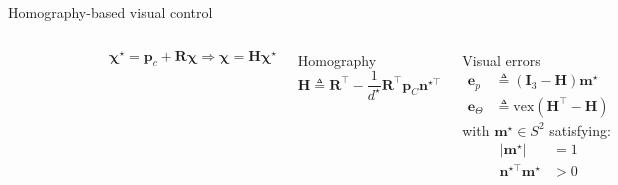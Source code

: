 \documentclass{beamer}
\begin{document}
\begin{frame}{Homography-based visual control}
\begin{columns}
	\begin{figure}
		\includegraphics[width = 50mm]{Images/Notation.png}
	\end{figure}\vspace{-0.5cm}
	$$\mathbf{\chi}^\star = \mathbf{p}_c + \mathbf{R}\mathbf{\chi} \Rightarrow \mathbf{\chi} = \mathbf{H}\mathbf{\chi}^\star$$ \vspace{-0.8cm}	
	\begin{block}{Homography}
		\vspace{-0.3cm}
		\begin{equation*}
		\mathbf{H} \triangleq \mathbf{R}^{\!\top} - \frac{1}{d^\star} \mathbf{R}^{\!\top} \mathbf{p}_C \mathbf{n}^{\star\!\top} 
		\end{equation*}
	\end{block}

	\begin{block}{Visual errors}
		\[
		\begin{array}{rl}
			\mathbf{e}_p &\triangleq (\mathbf{I}_3 - \mathbf{H})\mathbf{m}^\star\\
			\mathbf{e}_\Theta &\triangleq \mathrm{vex}(\mathbf{H}^\top - \mathbf{H}) 
		\end{array}
		\]		
		with $\mathbf{m}^\star \in S^2$ satisfying: \vspace{-0.3cm}
		\[
		\begin{array}{ll} 
			|\mathbf{m}^\star| &= 1 \\
			\mathbf{n}^{\star \top} \mathbf{m}^\star &> 0
		\end{array}
		\]
		 	

\end{block}
\end{columns}
\end{frame}
\end{document}
